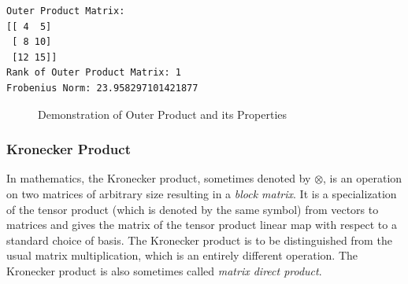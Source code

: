 \documentclass[
  letterpaper,
  DIV=11,
  numbers=noendperiod]{scrreprt}
\theoremstyle{plain}
\theoremstyle{definition}
\theoremstyle{remark}
\begin{document}
\begin{verbatim}
Outer Product Matrix:
[[ 4  5]
 [ 8 10]
 [12 15]]
Rank of Outer Product Matrix: 1
Frobenius Norm: 23.958297101421877
\end{verbatim}

\begin{figure}[H]


\caption{\label{fig-op}Demonstration of Outer Product and its
Properties}

\end{figure}%

\subsubsection*{Kronecker Product}\label{kronecker-product}

In mathematics, the Kronecker product, sometimes denoted by \(\otimes\),
is an operation on two matrices of arbitrary size resulting in a
\emph{block matrix}. It is a specialization of the tensor product (which
is denoted by the same symbol) from vectors to matrices and gives the
matrix of the tensor product linear map with respect to a standard
choice of basis. The Kronecker product is to be distinguished from the
usual matrix multiplication, which is an entirely different operation.
The Kronecker product is also sometimes called \emph{matrix direct
product}.
\end{document}
